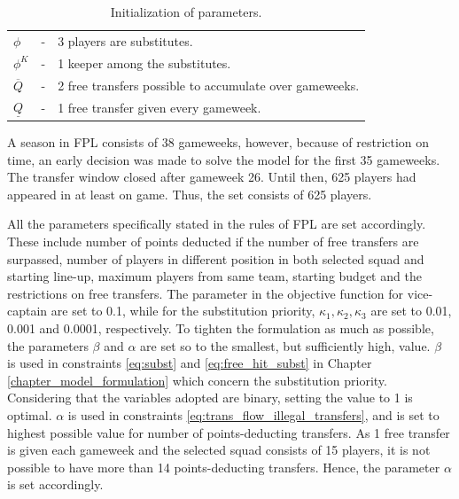 \begin{table}[H]
\begin{tabular}{@{}lll@{}}
$\phi$                           & - & 3 players are substitutes.                                                         \\
$\phi^{K}$                       & - & 1 keeper among the substitutes.                                                          \\
$\overline{Q}$                   & - & 2 free transfers possible to accumulate over gameweeks.                                              \\
$\underline{Q}$                  & - & 1 free transfer given every gameweek.                                      \\ \bottomrule
\end{tabular}
\caption{Initialization of parameters.}
\label{tab:initialization_of_parameters}
\end{table}

 
A season in FPL consists of 38 gameweeks, however, because of restriction on time, an early decision was made to solve the model for the first 35 gameweeks. The transfer window closed after gameweek 26. Until then, 625 players had appeared in at least on game. Thus, the set consists of 625 players.

\newpar

All the parameters specifically stated in the rules of FPL are set accordingly. These include number of points deducted if the number of free transfers are surpassed, number of players in different position in both selected squad and starting line-up, maximum players from same team, starting budget and the restrictions on free transfers. The parameter in the objective function for vice-captain are set to 0.1, while for the substitution priority, $\kappa_{1}, \kappa_{2}, \kappa_{3}$ are set to 0.01, 0.001 and 0.0001, respectively. To tighten the formulation as much as possible, the parameters $\beta$ and $\alpha$ are set so to the smallest, but sufficiently high, value. $\beta$ is used in constraints \eqref{eq:subst} and \eqref{eq:free_hit_subst} in Chapter \ref{chapter_model_formulation} which concern the substitution priority. Considering that the variables adopted are binary, setting the value to 1 is optimal. $\alpha$ is used in constraints \eqref{eq:trans_flow_illegal_transfers}, and is set to highest possible value for number of points-deducting transfers. As 1 free transfer is given each gameweek and the selected squad consists of 15 players, it is not possible to have more than 14 points-deducting transfers. Hence, the parameter $\alpha$ is set accordingly. 



